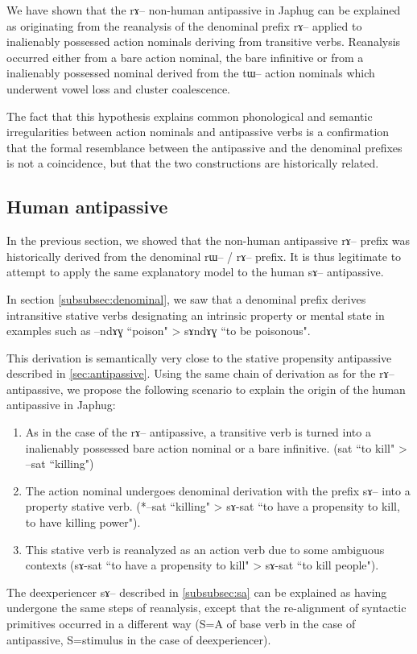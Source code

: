 \documentclass[oldfontcommands,oneside,a4paper,11pt]{article}
\newcommand{\ipa}[1]{{\phon \mbox{#1}}} %
\begin{document}
 
We have shown that the \ipa{rɤ}-- non-human antipassive in Japhug can be explained as originating from the reanalysis of the denominal prefix \ipa{rɤ}-- applied to inalienably possessed action nominals deriving from transitive verbs. Reanalysis occurred either from a bare action nominal, the bare infinitive or from a inalienably possessed nominal derived from the \ipa{tɯ}-- action nominals which underwent vowel loss and cluster coalescence. 

The fact that this hypothesis explains common phonological and semantic irregularities between action nominals and antipassive verbs is a  confirmation that the formal resemblance between the antipassive and the denominal prefixes is not a coincidence, but that the two constructions are historically related.


\subsection{Human antipassive} \label{subsec:human}

In the previous section, we   showed that the non-human antipassive \ipa{rɤ}-- prefix was historically derived from the denominal \ipa{rɯ}-- / \ipa{rɤ}-- prefix. It is thus  legitimate to attempt to apply the same explanatory model to the human \ipa{sɤ}-- antipassive.

In section \ref{subsubsec:denominal}, we saw that a denominal prefix  derives intransitive stative verbs designating an intrinsic property or mental state in examples such as \ipa{--ndɤɣ} ``poison" > \ipa{sɤndɤɣ} ``to be poisonous".


This derivation is semantically very close to the stative propensity antipassive described in \ref{sec:antipassive}. Using the same chain of derivation as for the \ipa{rɤ}-- antipassive, we propose the following scenario to explain the origin of the human antipassive in Japhug:
\begin{enumerate}
\item As in the case of the \ipa{rɤ}-- antipassive, a transitive verb is turned into a inalienably possessed bare action nominal or a bare infinitive. (\ipa{sat} ``to kill" > \ipa{--sat} ``killing")
\item The action nominal undergoes denominal derivation with the prefix \ipa{sɤ}-- into a property stative verb. (*\ipa{--sat} ``killing" > \ipa{sɤ-sat} ``to have a propensity to kill, to have killing power").
\item This stative verb is reanalyzed as an action verb due to some ambiguous contexts (\ipa{sɤ-sat} ``to have a propensity to kill"  > \ipa{sɤ-sat}  ``to kill people").
\end{enumerate}
The deexperiencer \ipa{sɤ}-- described in \ref{subsubsec:sa} can be explained as having undergone the same steps of reanalysis, except that the re-alignment of syntactic primitives occurred in a different way (S=A of base verb in the case of antipassive, S=stimulus in the case of deexperiencer).
\end{document}
